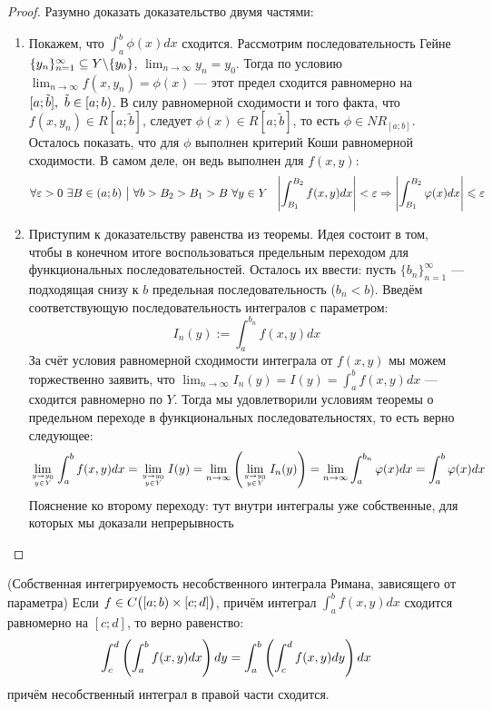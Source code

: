 \begin{proof}
	Разумно доказать доказательство двумя частями:
	\begin{enumerate}
		\item Покажем, что $\int_a^b \phi(x)dx$ сходится. Рассмотрим последовательность Гейне $\{y_n\}_{n = 1}^\infty \subseteq Y \backslash \{y_0\}$, $\lim_{n \to \infty} y_n = y_0$. Тогда по условию $\lim_{n \to \infty} f(x, y_n) = \phi(x)$ --- этот предел сходится равномерно на $[a; \tilde{b}],\ \tilde{b} \in \left[a; b\right)$. В силу равномерной сходимости и того факта, что $f(x, y_n) \in R[a; \tilde{b}]$, следует $\phi(x) \in R[a; \tilde{b}]$, то есть $\phi \in NR_{[a; b]}$. Осталось показать, что для $\phi$ выполнен критерий Коши равномерной сходимости. В самом деле, он ведь выполнен для $f(x, y)$:
		\[
			\forall \eps > 0\ \exists B \in (a; b) \such \forall b > B_2 > B_1 > B\ \forall y \in Y\ \ \md{\int_{B_1}^{B_2} f(x, y)dx} < \eps \Ra \md{\int_{B_1}^{B_2} \phi(x)dx} \le \eps
		\]
		
		\item Приступим к доказательству равенства из теоремы. Идея состоит в том, чтобы в конечном итоге воспользоваться предельным переходом для функциональных последовательностей. Осталось их ввести: пусть $\{b_n\}_{n = 1}^\infty$ --- подходящая снизу к $b$ предельная последовательность ($b_n < b$). Введём соответствующую последовательность интегралов с параметром:
		\[
			I_n(y) := \int_a^{b_n} f(x, y)dx
		\]
		За счёт условия равномерной сходимости интеграла от $f(x, y)$ мы можем торжественно заявить, что $\lim_{n \to \infty} I_n(y) = I(y) = \int_a^b f(x, y)dx$ --- сходится равномерно по $Y$. Тогда мы удовлетворили условиям теоремы о предельном переходе в функциональных последовательностях, то есть верно следующее:
		\[
			\lim_{y \to y_0 \atop {y \in Y}} \int_a^b f(x, y)dx = \lim_{y \to y_0 \atop {y \in Y}} I(y) = \lim_{n \to \infty} \left(\lim_{y \to y_0 \atop {y \in Y}} I_n(y)\right) = \lim_{n \to \infty} \int_a^{b_n} \varphi(x)dx = \int_a^b \varphi(x)dx
		\]
		Пояснение ко второму переходу: тут внутри интегралы уже собственные, для которых мы доказали непрерывность
	\end{enumerate}
\end{proof}

\begin{theorem} (Собственная интегрируемость несобственного интеграла Римана, зависящего от параметра)
	Если $f \in C\big(\! \left[a; b\right) \times [c; d]\big)$, причём интеграл $\int_a^b f(x, y)dx$ сходится равномерно на $[c; d]$, то верно равенство:
	\[
		\int_c^d \left(\int_a^b f(x, y)dx\right)dy = \int_a^b \left(\int_c^d f(x, y)dy\right)dx
	\]
	причём несобственный интеграл в правой части сходится.
\end{theorem}

